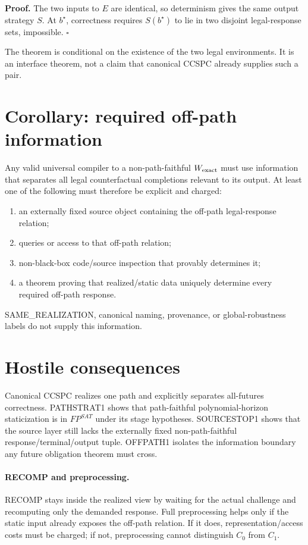 \documentclass[11pt]{article}
\begin{document}
\textbf{Proof.} The two inputs to \(E\) are identical, so determinism gives the same output strategy \(S\). At \(b^\star\), correctness requires \(S(b^\star)\) to lie in two disjoint legal-response sets, impossible. \(\square\)

The theorem is conditional on the existence of the two legal environments. It is an interface theorem, not a claim that canonical CCSPC already supplies such a pair.

\section*{Corollary: required off-path information}
Any valid universal compiler to a non-path-faithful \(W_{\rm exact}\) must use information that separates all legal counterfactual completions relevant to its output. At least one of the following must therefore be explicit and charged:
\begin{enumerate}
\item an externally fixed source object containing the off-path legal-response relation;
\item queries or access to that off-path relation;
\item non-black-box code/source inspection that provably determines it;
\item a theorem proving that realized/static data uniquely determine every required off-path response.
\end{enumerate}
SAME_REALIZATION, canonical naming, provenance, or global-robustness labels do not supply this information.

\section*{Hostile consequences}
Canonical CCSPC realizes one path and explicitly separates all-futures correctness. PATHSTRAT1 shows that path-faithful polynomial-horizon staticization is in \(FP^{SAT}\) under its stage hypotheses. SOURCESTOP1 shows that the source layer still lacks the externally fixed non-path-faithful response/terminal/output tuple. OFFPATH1 isolates the information boundary any future obligation theorem must cross.

\paragraph{RECOMP and preprocessing.}
RECOMP stays inside the realized view by waiting for the actual challenge and recomputing only the demanded response. Full preprocessing helps only if the static input already exposes the off-path relation. If it does, representation/access costs must be charged; if not, preprocessing cannot distinguish \(C_0\) from \(C_1\).
\end{document}
